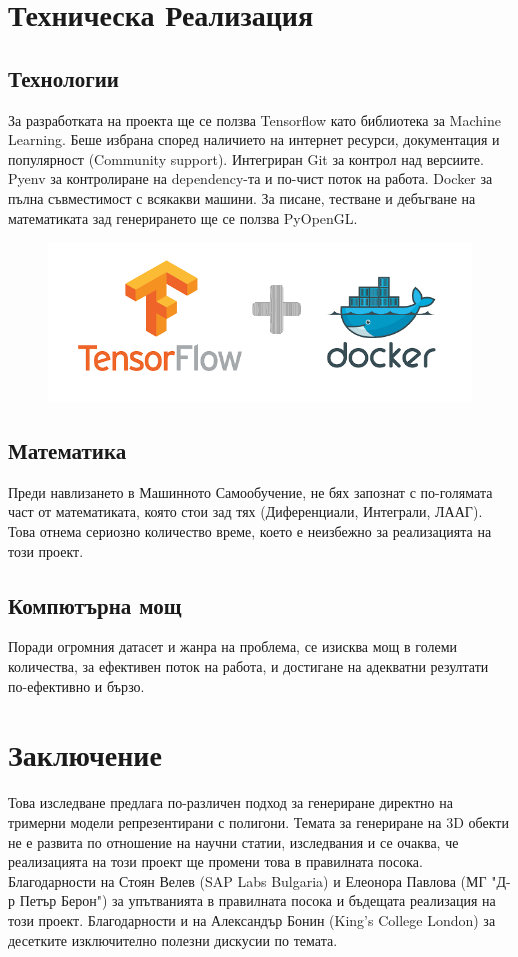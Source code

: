 \section{Техническа Реализация}
\subsection{Технологии}

За разработката на проекта ще се ползва Tensorflow като библиотека за Machine Learning. Беше избрана според наличието на интернет ресурси, документация и популярност (Community support). Интегриран Git за контрол над версиите. Pyenv за контролиране на dependency-та и по-чист поток на работа. Docker за пълна съвместимост с всякакви машини.
За писане, тестване и дебъгване на математиката зад генерирането ще се ползва PyOpenGL.

\begin{center}
\begin{figure}[h]
    \centering
    \includegraphics[width=330pt]{dockertf.png}
\end{figure}
\end{center}

\subsection{Математика}
Преди навлизането в Машинното Самообучение, не бях запознат с по-голямата част от математиката, която стои зад тях (Диференциали, Интеграли, ЛААГ). Това отнема сериозно количество време, което е неизбежно за реализацията на този проект.
\subsection{Компютърна мощ}
Поради огромния датасет и жанра на проблема, се изисква мощ в големи количества, за ефективен поток на работа, и достигане на адекватни резултати по-ефективно и бързо.
\section{Заключение}
Това изследване предлага по-различен подход за генериране директно на тримерни модели репрезентирани с полигони. Темата за генериране на 3D обекти не е развита по отношение на научни статии, изследвания и се очаква, че реализацията на този проект ще промени това в правилната посока. Благодарности на Стоян Велев (SAP Labs Bulgaria) и Елеонора Павлова (МГ "Д-р Петър Берон") за упътванията в правилната посока и бъдещата реализация на този проект.
Благодарности и на Александър Бонин (King's College London) за десетките изключително полезни дискусии по темата.